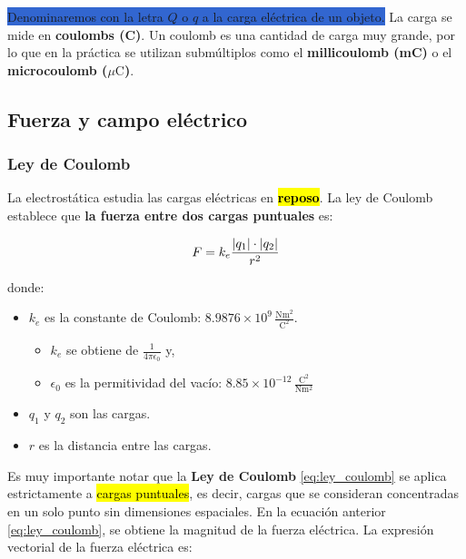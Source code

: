 \colorbox{highlight}{Denominaremos con la letra \( Q \) o \( q \) a la carga eléctrica de un objeto.} La carga se mide en \textbf{coulombs (C)}. Un coulomb es una cantidad de carga muy grande, por lo que en la práctica se utilizan submúltiplos como el \textbf{millicoulomb (mC)} o el \textbf{microcoulomb (\( \mu \text{C} \))}.

\subsection{Fuerza y campo eléctrico}

\subsubsection{Ley de Coulomb}

La electrostática estudia las cargas eléctricas en \hl{\textbf{reposo}}. La ley de Coulomb establece que \textbf{la fuerza entre dos cargas puntuales} es:

\begin{equation}
    F = k_e \frac{\abs{q_1} \cdot \abs{q_2}}{r^2}
    \label{eq:ley_coulomb}
\end{equation}

donde:

\begin{itemize}
    \item \( k_e \) es la constante de Coulomb: \( 8.9876 \times 10^9 \, \frac{\si{\newton\meter\squared}}{\si{\coulomb\squared}} \).
    \begin{itemize}
        \item \( k_e \) se obtiene de  \( \frac{1}{4\pi\epsilon_0} \) y,
        \item \( \epsilon_0 \) es la permitividad del vacío: \( 8.85 \times 10^{-12} \,\frac{\si{\coulomb\squared}}{\si{\newton\meter\squared}} \)
    \end{itemize}
    \item \( q_1 \) y \( q_2 \) son las cargas.
    \item \( r \) es la distancia entre las cargas.
\end{itemize}

Es muy importante notar que la \textbf{Ley de Coulomb} \eqref{eq:ley_coulomb} se aplica estrictamente a \hl{cargas puntuales}, es decir, cargas que se consideran concentradas en un solo punto sin dimensiones espaciales. En la ecuación anterior \eqref{eq:ley_coulomb}, se obtiene la magnitud de la fuerza eléctrica. La expresión vectorial de la fuerza eléctrica es:

